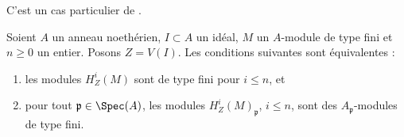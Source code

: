 \begin{lemma}
\label{lemma-check-finiteness-local-cohomology-locally}
\begin{reference}
C'est un cas particulier de \cite[Satz 1]{Faltings-finiteness}.
\end{reference}
Soient $A$ un anneau noethérien, $I \subset A$ un idéal, $M$ un
$A$-module de type fini et $n \geq 0$ un entier. Posons $Z = V(I)$.
Les conditions suivantes sont équivalentes :
\begin{enumerate}
\item les modules $H^i_Z(M)$ sont de type fini pour $i \leq n$, et
\item pour tout $\mathfrak p \in \Spec(A)$, les modules
$H^i_Z(M)_\mathfrak p$, $i \leq n$, sont des $A_\mathfrak p$-modules de type fini.
\end{enumerate}
\end{lemma}

